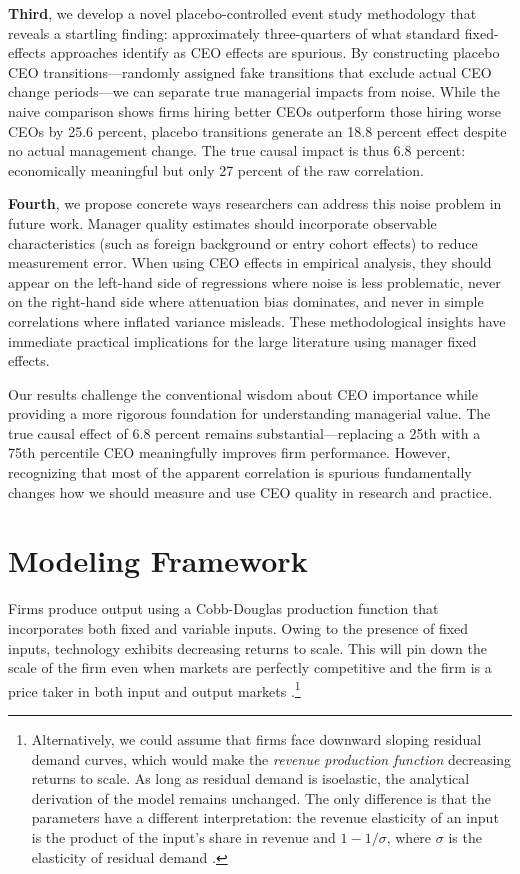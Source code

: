 \documentclass[11pt,a4paper]{article}
\begin{document}
\textbf{Third}, we develop a novel placebo-controlled event study methodology that reveals a startling finding: approximately three-quarters of what standard fixed-effects approaches identify as CEO effects are spurious. By constructing placebo CEO transitions---randomly assigned fake transitions that exclude actual CEO change periods---we can separate true managerial impacts from noise. While the naive comparison shows firms hiring better CEOs outperform those hiring worse CEOs by 25.6 percent, placebo transitions generate an 18.8 percent effect despite no actual management change. The true causal impact is thus 6.8 percent: economically meaningful but only 27 percent of the raw correlation.

\textbf{Fourth}, we propose concrete ways researchers can address this noise problem in future work. Manager quality estimates should incorporate observable characteristics (such as foreign background or entry cohort effects) to reduce measurement error. When using CEO effects in empirical analysis, they should appear on the left-hand side of regressions where noise is less problematic, never on the right-hand side where attenuation bias dominates, and never in simple correlations where inflated variance misleads. These methodological insights have immediate practical implications for the large literature using manager fixed effects.

Our results challenge the conventional wisdom about CEO importance while providing a more rigorous foundation for understanding managerial value. The true causal effect of 6.8 percent remains substantial---replacing a 25th with a 75th percentile CEO meaningfully improves firm performance. However, recognizing that most of the apparent correlation is spurious fundamentally changes how we should measure and use CEO quality in research and practice.


\section{Modeling Framework}
Firms produce output using a Cobb-Douglas production function that incorporates both fixed and variable inputs. Owing to the presence of fixed inputs, technology exhibits decreasing returns to scale. This will pin down the scale of the firm even when markets are perfectly competitive and the firm is a price taker in both input and output markets \citep{AtkesonKehoe2005JPE,McGrattan2012RED}.\footnote{Alternatively, we could assume that firms face downward sloping residual demand curves, which would make the \emph{revenue production function} decreasing returns to scale. As long as residual demand is isoelastic, the analytical derivation of the model remains unchanged. The only difference is that the parameters have a different interpretation: the revenue elasticity of an input is the product of the input's share in revenue and $1-1/\sigma$, where $\sigma$ is the elasticity of residual demand \citep{DeLoecker2011Econometrica}.}
\end{document}
